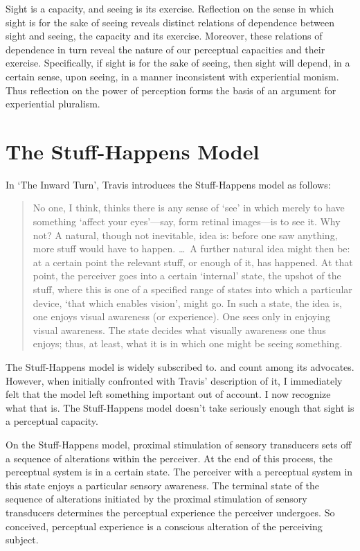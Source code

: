 \documentclass[12pt]{article}
\begin{document}
Sight is a capacity, and seeing is its exercise. Reflection on the sense in which sight is for the sake of seeing reveals distinct relations of dependence between sight and seeing, the capacity and its exercise. Moreover, these relations of dependence in turn reveal the nature of our perceptual capacities and their exercise. Specifically, if sight is for the sake of seeing, then sight will depend, in a certain sense, upon seeing, in a manner inconsistent with experiential monism. Thus reflection on the power of perception forms the basis of an argument for experiential pluralism.


\section{The Stuff-Happens Model} %
\label{sec:the_stuff_happens_model}

In `The Inward Turn', Travis introduces the Stuff-Happens model as follows:
\begin{quote}
    No one, I think, thinks there is any sense of ‘see’ in which merely to have something `affect your eyes'---say, form retinal images---is to see it. Why not? A natural, though not inevitable, idea is: before one saw anything, more stuff would have to happen. \ldots\ A further natural idea might then be: at a certain point the relevant stuff, or enough of it, has happened. At that point, the perceiver goes into a certain `internal' state, the upshot of the stuff, where this is one of a specified range of states into which a particular device, `that which enables vision', might go. In such a state, the idea is, one enjoys visual awareness (or experience). One sees only in enjoying visual awareness. The state decides what visually awareness one thus enjoys; thus, at least, what it is in which one might be seeing something. \citep[315]{Travis:2009fk}
\end{quote}
The Stuff-Happens model is widely subscribed to. \citet{Evans:1982ly} and \citet{Burge:2010uq} count among its advocates. However, when initially confronted with Travis' description of it, I immediately felt that the model left something important out of account. I now recognize what that is. The Stuff-Happens model doesn't take seriously enough that sight is a perceptual capacity.

On the Stuff-Happens model, proximal stimulation of sensory transducers sets off a sequence of alterations within the perceiver. At the end of this process, the perceptual system is in a certain state. The perceiver with a perceptual system in this state enjoys a particular sensory awareness. The terminal state of the sequence of alterations initiated by the proximal stimulation of sensory transducers determines the perceptual experience the perceiver undergoes. So conceived, perceptual experience is a conscious alteration of the perceiving subject.
\end{document}
